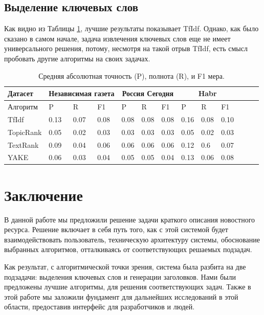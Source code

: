 \documentclass[14pt]{matmex-diploma-custom}
\begin{document}
\subsection{Выделение ключевых слов}

Как видно из Таблицы \ref{mae_mean_kw}, лучшие результаты показывает TfIdf. Однако, как было сказано в самом начале, задача извлечения ключевых слов еще не имеет универсального решения, потому, несмотря на такой отрыв TfIdf, есть смысл пробовать другие алгоритмы на своих задачах.

\begin{table}[ht]
  \begin{center}
    \begin{tabular}{l|lll|lll|lll|lll}
      \hline
      Датасет   &  \multicolumn{3}{|c|}{Независимая газета}      & \multicolumn{3}{|c|}{Россия Сегодня}       & \multicolumn{3}{|c|}{Habr}          \\
      \hline
      Алгоритм  &          P &            R &         F1 &          P &              R &         F1 &          P &       R &         F1 \\
          TfIdf &       0.13 &         0.07 &       0.08 &       0.08 &           0.08 &       0.08 &       0.16 &    0.08 &       0.10 \\
      TopicRank &       0.05 &         0.02 &       0.03 &       0.03 &           0.03 &       0.03 &       0.05 &    0.02 &       0.03 \\
       TextRank &       0.09 &         0.04 &       0.06 &       0.06 &           0.06 &       0.06 &       0.12 &     0.6 &       0.07 \\
           YAKE &       0.06 &         0.03 &       0.04 &       0.05 &           0.05 &       0.04 &       0.13 &    0.06 &       0.08 \\
      \hline
    \end{tabular}
    \caption{
      \label{mae_mean_kw} Средняя абсолютная точность (P), полнота (R), и F1 мера.
    }
  \end{center}
\end{table}


\section*{Заключение}
В данной работе мы предложили решение задачи краткого описания новостного ресурса. Решение включает в себя путь того, как с этой системой будет взаимодействовать пользователь, техническую архитектуру системы, обоснование выбранных алгоритмов, отталкиваясь от соответствующих решаемых подзадач.

Как результат, с алгоритмической точки зрения, система была разбита на две подзадачи: выделения ключевых слов и генерации заголовков. Нами были предложены лучшие алгоритмы, для решения соответствующих задач. Также в этой работе мы заложили фундамент для дальнейших исследований в этой области, предоставив интерфейс для разработчиков и людей.

\setmonofont[Mapping=tex-text]{CMU Typewriter Text}


\end{document}
